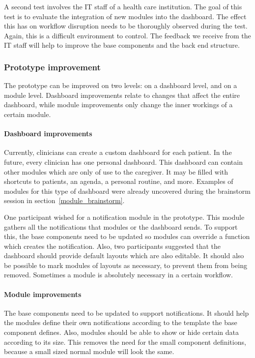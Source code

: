     A second test involves the IT staff of a health care institution. The goal of this test is to evaluate the integration of new modules into the dashboard. The effect this has on workflow disruption needs to be thoroughly observed during the test. Again, this is a difficult environment to control. The feedback we receive from the IT staff will help to improve the base components and the back end structure.
    
    \subsubsection{Prototype improvement}

    The prototype can be improved on two levels: on a dashboard level, and on a module level. Dashboard improvements relate to changes that affect the entire dashboard, while module improvements only change the inner workings of a certain module. 
    
    \paragraph{Dashboard improvements} Currently, clinicians can create a custom dashboard for each patient. In the future, every clinician has one personal dashboard. This dashboard can contain other modules which are only of use to the caregiver. It may be filled with shortcuts to patients, an agenda, a personal routine, and more. Examples of modules for this type of dashboard were already uncovered during the brainstorm session in section~\ref{module_brainstorm}.

    One participant wished for a notification module in the prototype. This module gathers all the notifications that modules or the dashboard sends. To support this, the base components need to be updated so modules can override a function which creates the notification. Also, two participants suggested that the dashboard should provide default layouts which are also editable. It should also be possible to mark modules of layouts as necessary, to prevent them from being removed. Sometimes a module is absolutely necessary in a certain workflow.

    \paragraph{Module improvements} The base components need to be updated to support notifications. It should help the modules define their own notifications according to the template the base component defines. Also, modules should be able to show or hide certain data according to its size. This removes the need for the small component definitions, because a small sized normal module will look the same.

